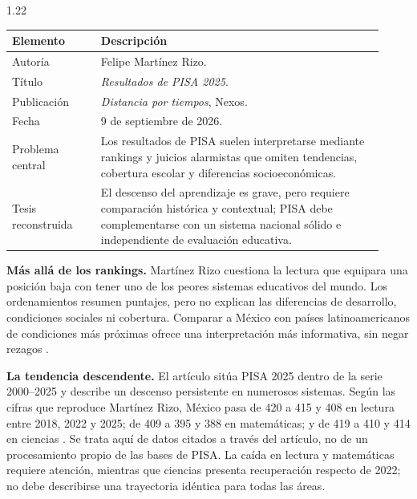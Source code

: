 \documentclass[spanish,letterpaper,oneside]{article}
\begin{document}
\begin{reportelecturabox}[title={Reporte de lectura 3: Felipe Martínez Rizo}]
\begin{spacing}{1.22}
\begin{fichalecturabox}
\begin{tabular}{@{}p{0.22\linewidth}p{0.70\linewidth}@{}}
\toprule
\textbf{Elemento} & \textbf{Descripción} \\
\midrule
Autoría & Felipe Martínez Rizo. \\
Título & \textit{Resultados de PISA 2025}. \\
Publicación & \textit{Distancia por tiempos}, Nexos. \\
Fecha & 9 de septiembre de 2026. \\
Problema central & Los resultados de PISA suelen interpretarse mediante rankings y juicios alarmistas que omiten tendencias, cobertura escolar y diferencias socioeconómicas. \\
Tesis reconstruida & El descenso del aprendizaje es grave, pero requiere comparación histórica y contextual; PISA debe complementarse con un sistema nacional sólido e independiente de evaluación educativa. \\
\bottomrule
\end{tabular}
\end{fichalecturabox}

\noindent\textbf{Más allá de los rankings.}\enspace
Martínez Rizo cuestiona la lectura que equipara una posición baja con tener uno de los peores sistemas educativos del mundo. Los ordenamientos resumen puntajes, pero no explican las diferencias de desarrollo, condiciones sociales ni cobertura. Comparar a México con países latinoamericanos de condiciones más próximas ofrece una interpretación más informativa, sin negar rezagos \citep{martinezRizo2026pisa}.

\medskip\noindent\textbf{La tendencia descendente.}\enspace
El artículo sitúa PISA 2025 dentro de la serie 2000--2025 y describe un descenso persistente en numerosos sistemas. Según las cifras que reproduce Martínez Rizo, México pasa de 420 a 415 y 408 en lectura entre 2018, 2022 y 2025; de 409 a 395 y 388 en matemáticas; y de 419 a 410 y 414 en ciencias \citep{martinezRizo2026pisa}. Se trata aquí de datos citados a través del artículo, no de un procesamiento propio de las bases de PISA. La caída en lectura y matemáticas requiere atención, mientras que ciencias presenta recuperación respecto de 2022; no debe describirse una trayectoria idéntica para todas las áreas.


\end{spacing}
\end{reportelecturabox}
\end{document}
